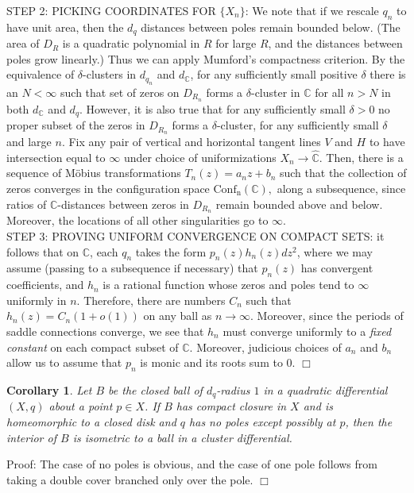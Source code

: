 \documentclass[12pt]{article}
\newtheorem{corollary}[theorem]{Corollary}
\newcommand{\cc}{\mathbb{C}}
\begin{document}
\noindent STEP 2: PICKING COORDINATES FOR $\{X_n\}$: We note that if we rescale $q_n$ to have unit area, then the $d_q$ distances between poles remain bounded below. (The area of $D_R$ is a quadratic polynomial in $R$ for large $R$, and the distances between poles grow linearly.) Thus we can apply Mumford's compactness criterion. By the equivalence of $\delta$-clusters in $d_{q_n}$ and $d_\cc$, for any sufficiently small positive $\delta$ there is an $N < \infty$ such that set of zeros on $D_{R_n}$ forms a $\delta$-cluster in $\cc$ for all $n > N$ in both $d_\cc$ and $d_q$. However, it is also true that for any sufficiently small $\delta > 0$ no proper subset of the zeros in $D_{R_n}$ forms a $\delta$-cluster, for any sufficiently small $\delta$ and large $n$. Fix any pair of vertical and horizontal tangent lines $V$ and $H$ to have intersection equal to $\infty$ under choice of uniformizations $X_n \to \hat{\cc}$. Then, there is a sequence of M\"obius transformations $T_n(z) = a_nz + b_n$ such that the collection of zeros converges in the configuration space $\mathrm{Conf_n(\cc)},$ along a subsequence, since ratios of $\cc$-distances between zeros in $D_{R_n}$ remain bounded above and below. Moreover, the locations of all other singularities go to $\infty$.\\

\noindent STEP 3: PROVING UNIFORM CONVERGENCE ON COMPACT SETS: it follows that on $\cc$, each $q_n$ takes the form $p_n(z)h_n(z)dz^2$, where we may assume (passing to a subsequence if necessary) that $p_n(z)$ has convergent coefficients, and $h_n$ is a rational function whose zeros and poles tend to $\infty$ uniformly in $n$. Therefore, there are numbers $C_n$ such that $h_n(z) = C_n(1 + o(1))$ on any ball as $n \to \infty$. Moreover, since the periods of saddle connections converge, we see that $h_n$ must converge uniformly to a \emph{fixed constant} on each compact subset of $\cc$. Moreover, judicious choices of $a_n$ and $b_n$ allow us to assume that $p_n$ is monic and its roots sum to $0$. $\Box$

\begin{corollary}Let $B$ be the closed ball of $d_q$-radius $1$ in a quadratic differential $(X,q)$ about a point $p \in X$. If $B$ has compact closure in $X$ and is homeomorphic to a closed disk and $q$ has no poles except possibly at $p$, then the interior of $B$ is isometric to a ball in a cluster differential. \end{corollary}

\noindent Proof: The case of no poles is obvious, and the case of one pole follows from taking a double cover branched only over the pole. $\Box$\\
\end{document}
